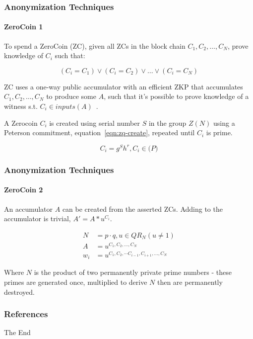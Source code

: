 \documentclass{beamer}
\begin{document}
\begin{frame}
\frametitle{Anonymization Techniques}
\framesubtitle{ZeroCoin 1}
To spend a ZeroCoin (ZC), given all ZCs in the block chain ${C_1, C_2,\dots,C_N}$, prove knowledge of $C_i$ such that:

\begin{equation}
    (C_i = C_1) \vee (C_i=C_2) \vee \dots \vee (C_i=C_N)
\end{equation}

ZC uses a one-way public accumulator with an efficient ZKP that accumulates ${C_1, C_2,\dots,C_N}$ to produce some $A$, such that it's possible to prove knowledge of a witness s.t. $C_i \in inputs(A)$~\cite{one-way-accumulators}.

A Zerocoin $C_{i}$ is created using serial number $S$ in the group $Z(N)$ using a Peterson commitment, equation~\ref{eqn:zq-create}, repeated until $C_i$ is prime.

\begin{equation}\label{eqn:zq-create}
C_{i}=g^Sh^r, C_i \in \mathbb(P)
\end{equation}
\end{frame}

\begin{frame}
\frametitle{Anonymization Techniques}
\framesubtitle{ZeroCoin 2}
An accumulator $A$ can be created from the asserted ZCs.  Adding to the accumulator is trivial, $A' = A*u^{C_i}$.

\begin{subequations}
    \begin{align}\label{eqn:zkp}
        N &= p \cdot q, u \in QR_{N}(u\neq1)\\
        A &= u^{C_1, C_2,\dots,C_N}\\
        w_i &=  u^{C_1, C_2,\cdots C_{i-1}, C_{i+1}, \dots ,C_N}
    \end{align}
\end{subequations}

Where $N$ is the product of two permanently private prime numbers - these primes are generated once, multiplied to derive $N$ then are permanently destroyed.
\end{frame}


\begin{frame}
\frametitle{References}
\footnotesize{
\printbibliography
}
\end{frame}
 
\begin{frame}
\centerline{The End}
\end{frame}
\end{document}

